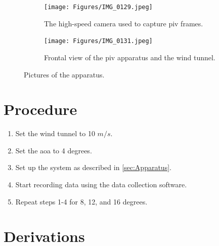\begin{figure}[htpb]
    \begin{subfigure}{0.49\textwidth}
        \centering
        \texttt{[image: Figures/IMG\_0129.jpeg]}
        \caption{The high-speed camera used to capture \acrshort{piv} frames.}
        \label{fig:high-speed_camera}
    \end{subfigure}
    \begin{subfigure}{0.49\textwidth}
        \centering
        \texttt{[image: Figures/IMG\_0131.jpeg]}
        \caption{Frontal view of the \acrshort{piv} apparatus and the wind tunnel.}
        \label{fig:full_apparatus}
    \end{subfigure}
    \caption{Pictures of the apparatus.}
    \label{fig:apparatus}
    \vspace*{3.5in}
\end{figure}

\section{Procedure} \label{sec:Prodedure}

\begin{enumerate}
\item Set the wind tunnel to 10 $m/s$.
\item Set the \acrshort{aoa} to 4 degrees.
\item Set up the system as described in \autoref{sec:Apparatus}.
\item Start recording data using the data collection software.
\item Repeat steps 1-4 for 8, 12, and 16 degrees.
\end{enumerate}

\newpage

\section{Derivations} \label{sec: Derivations}

